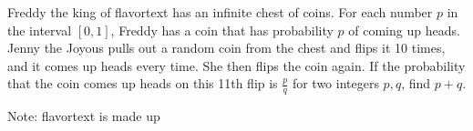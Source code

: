 Freddy the king of flavortext has an infinite chest of coins. For each number \(p\) in the interval \([0, 1]\),  Freddy has a coin that has probability \(p\) of coming up heads. Jenny the Joyous pulls out a random coin from the chest and flips it 10 times, and it comes up heads every time. She then flips the coin again. If the probability that the coin comes up heads on this 11th flip is \(\frac{p}{q}\) for two integers \(p, q\),  find \(p + q\).

Note: flavortext is made up